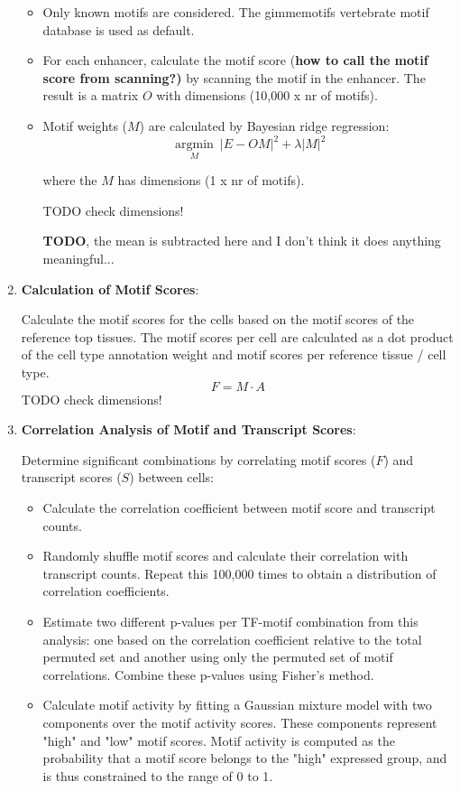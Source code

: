 \begin{enumerate}
    \begin{itemize}
        \item Only known motifs are considered. The gimmemotifs vertebrate motif database is used as default.
        \item For each enhancer, calculate the motif score (\textbf{how to call the motif score from scanning?)} by scanning the motif in the enhancer. The result is a matrix $O$ with dimensions (10,000 x nr of motifs).
        \item Motif weights ($M$) are calculated by Bayesian ridge regression:
        \begin{equation*}
            \underset{M}{\operatorname{argmin}}\ |E - O M|^2 + \lambda |M|^2
        \end{equation*}

        where the $M$ has dimensions (1 x nr of motifs).

        TODO check dimensions!

        \textbf{TODO}, the mean is subtracted here and I don't think it does anything meaningful... 
    \end{itemize}
    

    \item \textbf{Calculation of Motif Scores}:
    
    Calculate the motif scores for the cells based on the motif scores of the reference top tissues. The motif scores per cell are calculated as a dot product of the cell type annotation weight and motif scores per reference tissue / cell type.
    \begin{equation*}
        F = M \cdot A
    \end{equation*}
    TODO check dimensions!

    \item \textbf{Correlation Analysis of Motif and Transcript Scores}:
    
    Determine significant combinations by correlating motif scores ($F$) and transcript scores ($S$) between cells:
    \begin{itemize}
        \item Calculate the correlation coefficient between motif score and transcript counts.
        \item Randomly shuffle motif scores and calculate their correlation with transcript counts. Repeat this 100,000 times to obtain a distribution of correlation coefficients.
        \item Estimate two different p-values per TF-motif combination from this analysis: one based on the correlation coefficient relative to the total permuted set and another using only the permuted set of motif correlations. Combine these p-values using Fisher's method.
        \item Calculate motif activity by fitting a Gaussian mixture model with two components over the motif activity scores. These components represent "high" and "low" motif scores. Motif activity is computed as the probability that a motif score belongs to the "high" expressed group, and is thus constrained to the range of 0 to 1.
    \end{itemize}
\end{enumerate}

